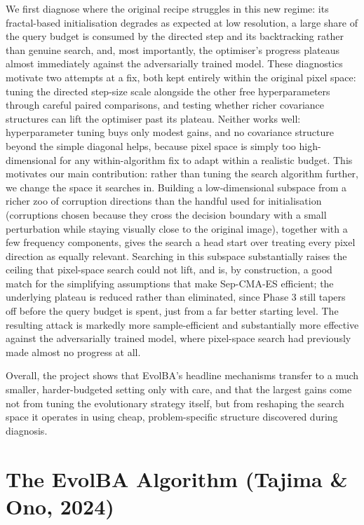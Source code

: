 \documentclass[11pt, a4paper]{article}
\begin{document}
We first diagnose where the original recipe struggles in this new regime: its fractal-based initialisation degrades as expected at low resolution, a large share of the query budget is consumed by the directed step and its backtracking rather than genuine search, and, most importantly, the optimiser's progress plateaus almost immediately against the adversarially trained model. These diagnostics motivate two attempts at a fix, both kept entirely within the original pixel space: tuning the directed step-size scale alongside the other free hyperparameters through careful paired comparisons, and testing whether richer covariance structures can lift the optimiser past its plateau. Neither works well: hyperparameter tuning buys only modest gains, and no covariance structure beyond the simple diagonal helps, because pixel space is simply too high-dimensional for any within-algorithm fix to adapt within a realistic budget. This motivates our main contribution: rather than tuning the search algorithm further, we change the space it searches in. Building a low-dimensional subspace from a richer zoo of corruption directions than the handful used for initialisation (corruptions chosen because they cross the decision boundary with a small perturbation while staying visually close to the original image), together with a few frequency components, gives the search a head start over treating every pixel direction as equally relevant. Searching in this subspace substantially raises the ceiling that pixel-space search could not lift, and is, by construction, a good match for the simplifying assumptions that make Sep-CMA-ES efficient; the underlying plateau is reduced rather than eliminated, since Phase 3 still tapers off before the query budget is spent, just from a far better starting level. The resulting attack is markedly more sample-efficient and substantially more effective against the adversarially trained model, where pixel-space search had previously made almost no progress at all.

Overall, the project shows that EvolBA's headline mechanisms transfer to a much smaller, harder-budgeted setting only with care, and that the largest gains come not from tuning the evolutionary strategy itself, but from reshaping the search space it operates in using cheap, problem-specific structure discovered during diagnosis.

\section{The EvolBA Algorithm (Tajima \& Ono, 2024)}
\label{sec:evolba_paper}
\end{document}
